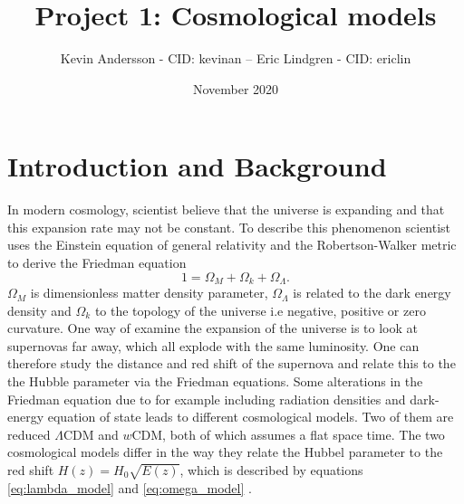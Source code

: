 \documentclass[11pt,a4paper]{article}
\title{Project 1: Cosmological models}
\author{Kevin Andersson - CID: kevinan -- Eric Lindgren - CID: ericlin}
\date{November 2020}
\begin{document}
\maketitle
{}%
\clearpage

\setcounter{page}{1}
\section{Introduction and Background}
In modern cosmology, scientist believe that the universe is expanding and that this expansion rate may not be constant. To describe this phenomenon scientist uses the Einstein equation of general relativity and the Robertson-Walker metric to derive the Friedman equation 
\begin{equation*}
    1 = \Omega_{M} + \Omega_{k} + \Omega_{\Lambda}.
\end{equation*}
$\Omega_M$ is dimensionless matter density parameter, $\Omega_\Lambda$ is related to the dark energy density and $\Omega_k$ to the topology of the universe i.e negative, positive or zero curvature. One way of examine the expansion of the universe is to look at supernovas far away, which all explode with the same luminosity. One can therefore study the distance and red shift of the supernova and relate this to the the Hubble parameter via the Friedman equations. Some alterations in the Friedman equation due to for example including radiation densities and dark-energy equation of state leads to different cosmological models. Two of them are reduced $\Lambda$CDM and $w$CDM, both of which assumes a flat space time. The two cosmological models differ in the way they relate the Hubbel parameter to the red shift $H(z) = H_0\sqrt{E(z)}$, which is described by equations \eqref{eq:lambda_model} and \eqref{eq:omega_model} \cite{project_pm}.

\end{document}
